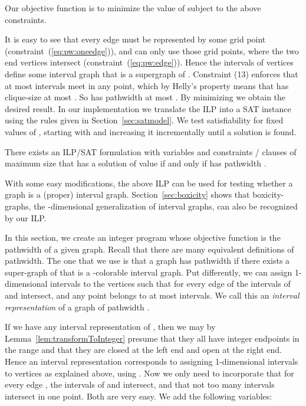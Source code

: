 \documentclass[runningheads]{llncs}
\newcounter{constr}
\begin{document}
Our objective function is to minimize the value of  subject to the above constraints.

It is easy to see that every edge must be represented by some grid
point (constraint~(\ref{eq:pw:oneedge})), and can only use those grid
points, where the two end vertices intersect
(constraint~(\ref{eq:pw:edge})). Hence the intervals of vertices
define some interval graph  that is a supergraph of . 
Constraint (13) enforces that at most  intervals meet in any
point, which by Helly's property means that  has clique-size at
most . So  has pathwidth at most . 
By minimizing  we obtain the desired result. 
In our implementation we translate the ILP into a SAT instance
using the rules given in Section~\ref{sec:satmodel}. 
We test satisfiability
for fixed values of , starting with  and increasing it
incrementally until a solution is found.
\begin{theorem}
There exists an ILP/SAT formulation with  variables
and  constraints /  clauses of
maximum size  that has a solution of value  if and only
if  has pathwidth .
\end{theorem}

\par
With some easy modifications, the above ILP can be used 
for testing whether a graph is a (proper) interval graph. Section~\ref{sec:boxicity} shows that boxicity- graphs, the -dimensional generalization of interval graphs, can also be recognized by our ILP.


\iffalse

In this section, we create an integer program whose objective
function is the pathwidth of a given graph.
Recall that there are many equivalent definitions of pathwidth.
The one that we use is that a graph  has pathwidth  
if there exists a super-graph  of  that is a -colorable
interval graph.  Put differently, we can assign 1-dimensional
intervals to the vertices such that for every edge  of 
the intervals of  and  intersect, and any point belongs to at
most  intervals.  We call this an {\em interval representation}
of a graph of pathwidth .

If we have any interval representation of , then we may by
Lemma~\ref{lem:transformToInteger} presume
that they all have integer endpoints in the range 
and that they are closed at the left end and open at the right end.
Hence an interval representation corresponds to assigning
1-dimensional intervals to vertices as explained above, using .  
Now we only
need to incorporate that for every edge , the intervals
of  and  intersect, and that not too many intervals intersect
in one point.    Both are very easy.  We add the following variables:
\end{document}

